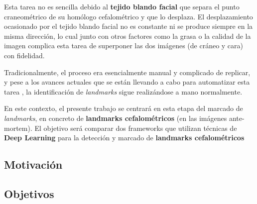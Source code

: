 \noindent Esta tarea no es sencilla debido al \textbf{tejido blando facial} que separa el punto craneométrico de su homólogo cefalométrico y que lo desplaza. El desplazamiento ocasionado por el tejido blando facial no es constante ni se produce siempre en la misma dirección, lo cual junto con otros factores como la grasa o la calidad de la imagen complica esta tarea de superponer las dos imágenes (de cráneo y cara) con fidelidad.

\medskip

\noindent Tradicionalmente, el proceso era esencialmente manual y complicado de replicar, y pese a los avances actuales que se están llevando a cabo para automatizar esta tarea \cite{Huete2015PastPA}, la identificación de \textit{landmarks} sigue realizándose a mano normalmente. 

\medskip

\noindent En este contexto, el presente trabajo se centrará en esta etapa del marcado de \textit{landmarks}, en concreto de \textbf{landmarks cefalométricos} (en las imágenes ante-mortem). El objetivo será comparar dos frameworks que utilizan técnicas de \textbf{Deep Learning} para la detección y marcado de \textbf{landmarks cefalométricos}  
\subsection{Motivación}
\subsection{Objetivos}




\endinput



